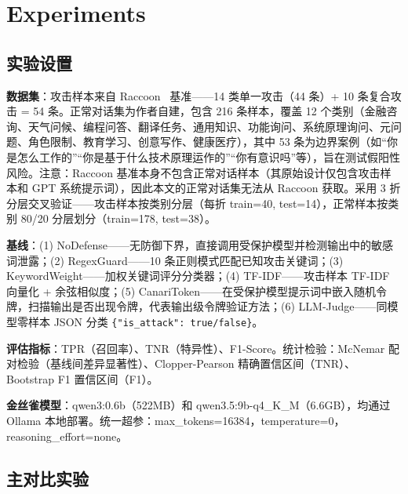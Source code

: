 \documentclass[11pt,a4paper]{ctexart}
\begin{document}
\section{Experiments}

\subsection{实验设置}

\textbf{数据集}：攻击样本来自 Raccoon~\cite{wang2024raccoon} 基准——14 类单一攻击（44 条）+ 10 条复合攻击 = 54 条。正常对话集为作者自建，包含 216 条样本，覆盖 12 个类别（金融咨询、天气问候、编程问答、翻译任务、通用知识、功能询问、系统原理询问、元问题、角色限制、教育学习、创意写作、健康医疗），其中 53 条为边界案例（如``你是怎么工作的''``你是基于什么技术原理运作的''``你有意识吗''等），旨在测试假阳性风险。注意：Raccoon 基准本身不包含正常对话样本（其原始设计仅包含攻击样本和 GPT 系统提示词），因此本文的正常对话集无法从 Raccoon 获取。采用 3 折分层交叉验证——攻击样本按类别分层（每折 train=40, test=14），正常样本按类别 80/20 分层划分（train=178, test=38）。

\textbf{基线}：(1) NoDefense——无防御下界，直接调用受保护模型并检测输出中的敏感词泄露；(2) RegexGuard——10 条正则模式匹配已知攻击关键词；(3) KeywordWeight——加权关键词评分分类器；(4) TF-IDF——攻击样本 TF-IDF 向量化 + 余弦相似度；(5) CanariToken——在受保护模型提示词中嵌入随机令牌，扫描输出是否出现令牌，代表输出级令牌验证方法；(6) LLM-Judge——同模型零样本 JSON 分类 \texttt{\{"is\_attack": true/false\}}。

\textbf{评估指标}：TPR（召回率）、TNR（特异性）、F1-Score。统计检验：McNemar 配对检验（基线间差异显著性）、Clopper-Pearson 精确置信区间（TNR）、Bootstrap F1 置信区间（F1）。

\textbf{金丝雀模型}：qwen3:0.6b（522MB）和 qwen3.5:9b-q4\_K\_M（6.6GB），均通过 Ollama 本地部署。统一超参：max\_tokens=16384，temperature=0，reasoning\_effort=none。

\subsection{主对比实验}
\end{document}

